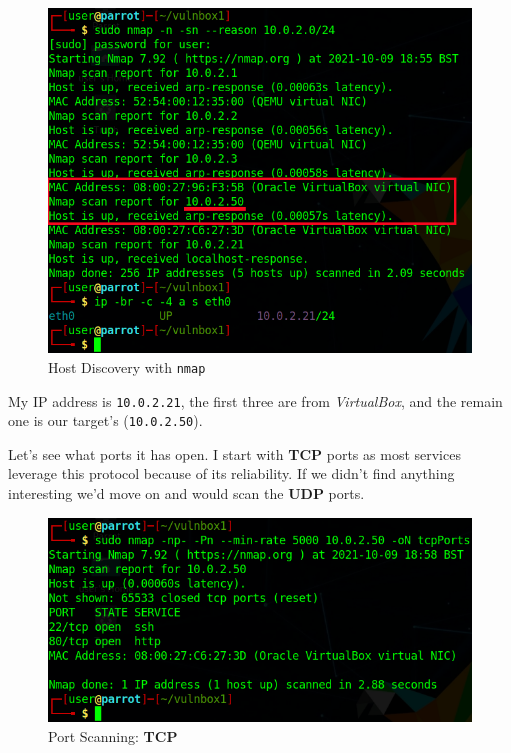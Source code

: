 \documentclass[12pt]{article}
\begin{document}
    \begin{figure}[H]\label{pic:01-host-discovery}
        \centering
        \includegraphics[width=1.00\textwidth]{01-host-discovery-gimp.png}
        \caption{Host Discovery with \texttt{nmap}}
    \end{figure}

    My IP address is \texttt{10.0.2.21}, the first three are from
    \textit{VirtualBox}, and the remain one is our target's
    (\texttt{10.0.2.50}).

    Let's see what ports it has open. I start with \textbf{TCP} ports as most
    services leverage this protocol because of its reliability. If we didn't
    find anything interesting we'd move on and would scan the \textbf{UDP}
    ports.

    \begin{figure}[H]\label{pic:02-nmap-tcpPorts}
        \centering
        \includegraphics[width=1.00\textwidth]{02-nmap-tcpPorts.png}
        \caption{Port Scanning: \textbf{TCP}}
    \end{figure}
\end{document}
